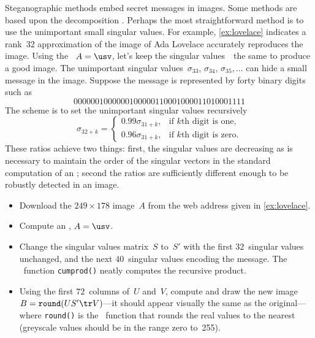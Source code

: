 \begin{reduce}
\begin{exercise}  
 Steganographic methods embed secret messages in images.
Some methods are based upon the  decomposition \cite[e.g.]{Gorodetski2001}. %
Perhaps the most straightforward method is to use the unimportant small singular values.
For example, \cref{ex:lovelace} indicates a rank~32 approximation of the image of Ada Lovelace accurately reproduces the image.
Using the \svd\ \(A=\usv\), let's keep the singular values~\hlist{}\ the same to produce a good image.
The unimportant singular values~\(\sigma_{33}\), \(\sigma_{34}\), \(\sigma_{35},\ldots\) can hide a small message in the image.
Suppose the message is represented by forty binary digits such as
\begin{equation*}
0000001000000100000110001000011010001111
\end{equation*}
The scheme is to set the unimportant singular values recursively
\begin{equation*}
\sigma_{32+k}=\begin{cases}0.99\sigma_{31+k},
&\text{if \(k\)th digit is one},
\\0.96\sigma_{31+k},
&\text{if \(k\)th digit is zero}.
\end{cases}
\end{equation*}
These ratios achieve two things: first, the singular values are decreasing as is necessary to maintain the order of the singular vectors in the standard computation of an \svd; second the ratios are sufficiently different enough to be robustly detected in an image.
\begin{itemize}
\item Download the \(249\times178\) image~\(A\) from the web address given in \cref{ex:lovelace}.

\item Compute an \svd, \(A=\usv\).

\item Change the singular values matrix~\(S\) to~\(S'\) with the first \(32\)~singular values unchanged, and the next \(40\)~singular values encoding the message.
The \script\ function \verb|cumprod()| neatly computes the recursive product.

\item Using the first \(72\)~columns of~\(U\) and~\(V\), compute and draw the new image \(B=\verb|round|(US'\tr V)\)---it should appear visually the same as the original---%
where \verb|round()| is the \script\ function that rounds the real values to the nearest  (greyscale values should be in the range zero to~255). 


\end{itemize}
\end{exercise}
\end{reduce}
